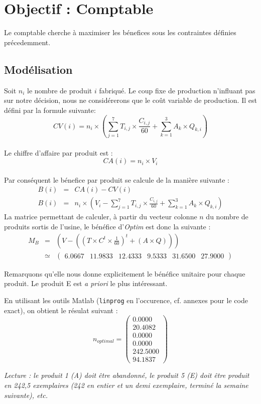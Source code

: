 \newpage
\section{Objectif : Comptable}
Le comptable cherche à maximiser les bénefices sous les contraintes définies
précedemment.

\subsection{Modélisation}
Soit $n_i$ le nombre de produit $i$ fabriqué. Le coup fixe de production
n'influant pas sur notre décision, nous ne considérerons que le coût variable de
production. Il est défini par la formule suivante:
\begin{displaymath}
CV(i) = n_i \times \left (\sum_{j = 1}^{7} T_{i,j} \times 
\frac{C_{i,j}}{60} + \sum_{k = 1}^{3} A_{k} \times Q_{k,i} \right )
\end{displaymath}
~\\
Le chiffre d'affaire par produit est :
\begin{displaymath}
CA(i) = n_i \times V_i
\end{displaymath}
~\\
Par conséquent le bénefice par produit se calcule de la manière suivante :
\begin{eqnarray*}
	B(i) &=& CA(i) - CV(i)\\
	B(i) &=& n_i  \times \left (V_i - \sum_{j = 1}^{7} T_{i,j} \times \frac{C_{i,j}}{60} +
	\sum_{k = 1}^{3} A_{k} \times Q_{k,i} \right )
\end{eqnarray*}
La matrice permettant de calculer, à partir du vecteur colonne $n$ du nombre de produits sortis de l'usine, le bénéfice d'\emph{Optim} est donc la suivante :
\begin{eqnarray*}
	M_{B} &=&  \left(V - \left( \left(T \times C^{t} \times \frac{1}{60} \right)^{t} + \left(A \times Q\right) \right)\right) \\
		&\simeq& \begin{pmatrix} 6.0667 & 11.9833 & 12.4333 & 9.5333 & 31.6500 & 27.9000 \end{pmatrix}
\end{eqnarray*}

Remarquons qu'elle nous donne explicitement le bénéfice unitaire pour chaque produit. Le produit E est \emph{a priori} le plus intéressant.

En utilisant les outils Matlab (\texttt{linprog} en l'occurence, cf. annexes pour le code exact), on obtient le résulat suivant :
\[
	n_{optimal} = 
\begin{pmatrix}
    0.0000 \\
   20.4082 \\
    0.0000 \\
    0.0000 \\
  242.5000 \\
   94.1837
\end{pmatrix}
\]
\begin{center}
\par\noindent\textit{Lecture : le produit 1 (A) doit être abandonné, le produit 5 (E) doit être produit en 242,5 exemplaires (242 en entier et un demi exemplaire, terminé la semaine suivante), etc.}
\end{center}

